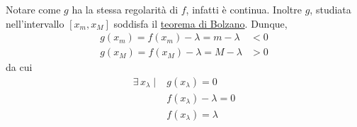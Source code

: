\documentclass[../../analisi1]{subfiles}
\begin{document}
            Notare come \(g\) ha la stessa regolarità di \(f\), infatti è continua. Inoltre \(g\), studiata
            nell'intervallo \([x_m, x_M]\) soddisfa il \hyperref[teoBolzano]{teorema di Bolzano}. Dunque,
            \begin{align*}
                g(x_m) = f(x_m) - \lambda = m - \lambda &< 0\\
                g(x_M) = f(x_M) - \lambda = M - \lambda &> 0
            \end{align*}
            da cui
            \begin{align*}
                \exists \, x_\lambda \; | \; &g(x_\lambda) = 0\\
                &f(x_\lambda) - \lambda = 0\\
                &f(x_\lambda) = \lambda
            \end{align*}
        
\end{document}

